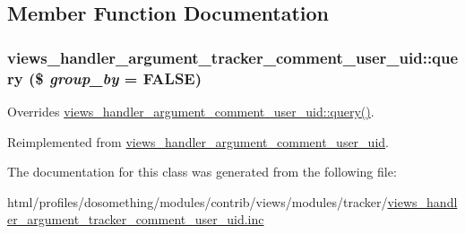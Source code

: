 \subsection{Member Function Documentation}
\hypertarget{classviews__handler__argument__tracker__comment__user__uid_aa47cdf41b905e786067d25527bca1f1f}{
\subsubsection[{query}]{\setlength{\rightskip}{0pt plus 5cm}views\_\-handler\_\-argument\_\-tracker\_\-comment\_\-user\_\-uid::query (\$ {\em group\_\-by} = {\ttfamily FALSE})}}
\label{classviews__handler__argument__tracker__comment__user__uid_aa47cdf41b905e786067d25527bca1f1f}
Overrides \hyperlink{classviews__handler__argument__comment__user__uid_a6c3118256c6d2c60167d289c947d31c6}{views\_\-handler\_\-argument\_\-comment\_\-user\_\-uid::query()}. 

Reimplemented from \hyperlink{classviews__handler__argument__comment__user__uid_a6c3118256c6d2c60167d289c947d31c6}{views\_\-handler\_\-argument\_\-comment\_\-user\_\-uid}.

The documentation for this class was generated from the following file:\begin{DoxyCompactItemize}
\item 
html/profiles/dosomething/modules/contrib/views/modules/tracker/\hyperlink{views__handler__argument__tracker__comment__user__uid_8inc}{views\_\-handler\_\-argument\_\-tracker\_\-comment\_\-user\_\-uid.inc}\end{DoxyCompactItemize}
